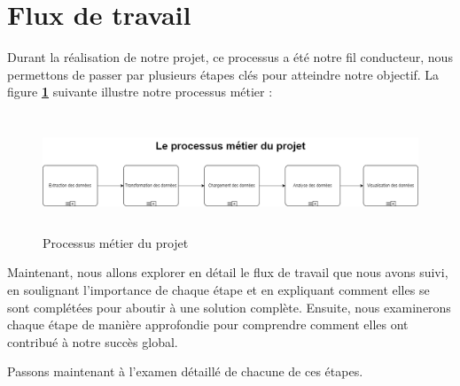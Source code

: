   \section{Flux de travail}
  \par Durant la réalisation de notre projet, ce processus a été notre fil conducteur, nous permettons de passer par plusieurs étapes clés pour atteindre notre objectif. 
\newpage
La figure \textbf{\ref{fig:BPMN}} suivante illustre notre processus métier :
        \begin{figure}[H]
        \centering
        \includegraphics[width=1\linewidth, height=3.5cm]{img/conception/BPMN.png}
        \caption{Processus métier du projet}
        \label{fig:BPMN}
        \end{figure}
  \par Maintenant, nous allons explorer en détail le flux de travail que nous avons suivi, en soulignant l'importance de chaque étape et en expliquant comment elles se sont complétées pour aboutir à une solution complète. 
  Ensuite, nous examinerons chaque étape de manière approfondie pour comprendre comment elles ont contribué à notre succès global.
  \par Passons maintenant à l'examen détaillé de chacune de ces étapes.

